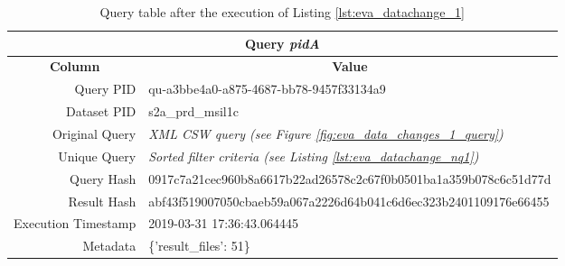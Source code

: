 \documentclass[draft,final]{vutinfth} %
\begin{document}
\begin{enumerate}
	
	\begin{table}[]
		\caption{Query table after the execution of Listing \ref{lst:eva_datachange_1}}
		\centering
		\begin{tabular}{|r|l|}
			\hline \multicolumn{2}{|c|}{\textbf{Query \textit{pidA}}} \\
			\hline \multicolumn{1}{|c|}{\textbf{Column}}  &  \multicolumn{1}{c|}{\textbf{Value}} \\ \hline
			Query PID & qu-a3bbe4a0-a875-4687-bb78-9457f33134a9  \\ 
			Dataset PID & s2a\_prd\_msil1c  \\ 
			Original Query & \textit{XML CSW query (see Figure \ref{fig:eva_data_changes_1_query})}   \\
			Unique Query & \textit{Sorted filter criteria (see Listing \ref{lst:eva_datachange_nq1})}  \\
			Query Hash & 0917c7a21cec960b8a6617b22ad26578c2c67f0b0501ba1a359b078c6c51d77d  \\
			Result Hash & abf43f519007050cbaeb59a067a2226d64b041c6d6ec323b2401109176e66455   \\
			Execution Timestamp & 2019-03-31 17:36:43.064445   \\ 
			Metadata & \{'result\_files': 51\}  \\ \hline
		\end{tabular}
		\label{Tab:eva_datachanges1}
	\end{table}
\end{enumerate}
\end{document}
